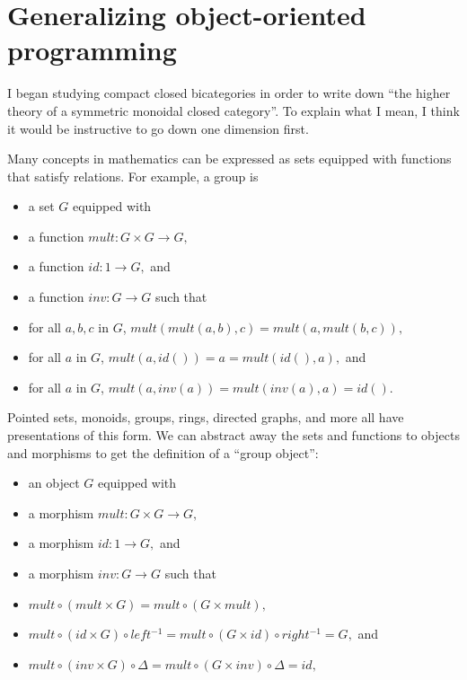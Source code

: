 \documentclass[12pt,twoside,openright]{report}
\newcommand{\maps}{\colon}
\begin{document}
\section*{Generalizing object-oriented programming}
I began studying compact closed bicategories in order to write down ``the higher theory of a symmetric monoidal closed category''.  To explain what I mean, I think it would be instructive to go down one dimension first.

Many concepts in mathematics can be expressed as sets equipped with functions that satisfy relations.  For example, a group is
\begin{itemize}
  \item a set $G$ equipped with
  \item a function $mult\maps G \times G \to G,$
  \item a function $id\maps 1 \to G,$ and
  \item a function $inv\maps G \to G$ such that
  \item for all $a, b, c$ in $G$, $mult(mult(a, b), c) = mult(a, mult(b, c)),$
  \item for all $a$ in $G$, $mult(a, id()) = a = mult(id(), a),$ and
  \item for all $a$ in $G$, $mult(a, inv(a)) = mult(inv(a), a) = id().$
\end{itemize}
Pointed sets, monoids, groups, rings, directed graphs, and more all have presentations of this form.  We can abstract away the sets and functions to objects and morphisms to get the definition of a ``group object'':
\begin{itemize}
  \item an object $G$ equipped with
  \item a morphism $mult\maps G \times G \to G,$
  \item a morphism $id\maps 1 \to G,$ and
  \item a morphism $inv\maps G \to G$ such that
  \item $mult \circ (mult \times G) = mult \circ (G \times mult),$
  \item $mult \circ (id \times G) \circ left^{-1} = mult \circ (G \times id) \circ right^{-1} = G,$ and
  \item $mult \circ (inv \times G) \circ \Delta = mult \circ (G \times inv) \circ \Delta = id,$
\end{itemize}
\end{document}
